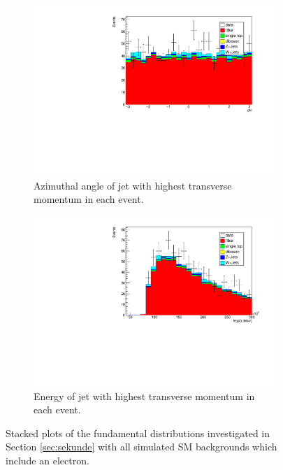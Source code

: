 \begin{figure}[H]
  \begin{subfigure}{0.45\textwidth}%
    \centering%
    \includegraphics[width=\textwidth]{plots/comparism/jet_phi_max.pdf}%
    \caption{Azimuthal angle of jet with highest transverse momentum in each event.}%
    \label{fig:6g}%
  \end{subfigure}%
  \hfill
  \begin{subfigure}{0.45\textwidth}%
    \centering%
    \includegraphics[width=\textwidth]{plots/comparism/jet_E_max.pdf}%
    \caption{Energy of jet with highest transverse momentum in each event.}%
    \label{fig:6h}%
  \end{subfigure}%
  \caption{Stacked plots of the fundamental distributions investigated in Section \ref{sec:sekunde} with all simulated SM backgrounds which include an electron.}%
  \label{fig:6}%
\end{figure}

